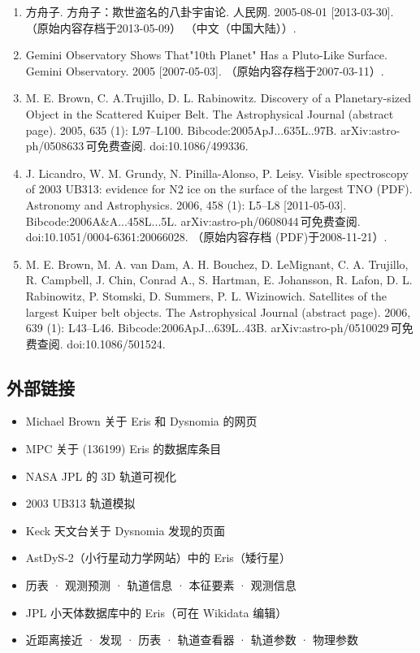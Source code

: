 \begin{enumerate}
\item 方舟子. 方舟子：欺世盗名的八卦宇宙论. 人民网. 2005-08-01 [2013-03-30]. （原始内容存档于2013-05-09） （中文（中国大陆））.
\item Gemini Observatory Shows That"10th Planet" Has a Pluto-Like Surface. Gemini Observatory. 2005 [2007-05-03]. （原始内容存档于2007-03-11）.
\item M. E. Brown, C. A.Trujillo, D. L. Rabinowitz. Discovery of a Planetary-sized Object in the Scattered Kuiper Belt. The Astrophysical Journal (abstract page). 2005, 635 (1): L97–L100. Bibcode:2005ApJ...635L..97B. arXiv:astro-ph/0508633 可免费查阅. doi:10.1086/499336.
\item J. Licandro, W. M. Grundy, N. Pinilla-Alonso, P. Leisy. Visible spectroscopy of 2003 UB313: evidence for N2 ice on the surface of the largest TNO (PDF). Astronomy and Astrophysics. 2006, 458 (1): L5–L8 [2011-05-03]. Bibcode:2006A&A...458L...5L. arXiv:astro-ph/0608044 可免费查阅. doi:10.1051/0004-6361:20066028. （原始内容存档 (PDF)于2008-11-21）.
\item M. E. Brown, M. A. van Dam, A. H. Bouchez, D. LeMignant, C. A. Trujillo, R. Campbell, J. Chin, Conrad A., S. Hartman, E. Johansson, R. Lafon, D. L. Rabinowitz, P. Stomski, D. Summers, P. L. Wizinowich. Satellites of the largest Kuiper belt objects. The Astrophysical Journal (abstract page). 2006, 639 (1): L43–L46. Bibcode:2006ApJ...639L..43B. arXiv:astro-ph/0510029 可免费查阅. doi:10.1086/501524.
\end{enumerate}
\subsection{外部链接}
\begin{itemize}
\item Michael Brown 关于 Eris 和 Dysnomia 的网页  
\item MPC 关于 (136199) Eris 的数据库条目  
\item NASA JPL 的 3D 轨道可视化  
\item 2003 UB313 轨道模拟  
\item Keck 天文台关于 Dysnomia 发现的页面  
\item AstDyS-2（小行星动力学网站）中的 Eris（矮行星）  
\item 历表 · 观测预测 · 轨道信息 · 本征要素 · 观测信息  
\item JPL 小天体数据库中的 Eris（可在 Wikidata 编辑）  
\item 近距离接近 · 发现 · 历表 · 轨道查看器 · 轨道参数 · 物理参数
\end{itemize}












